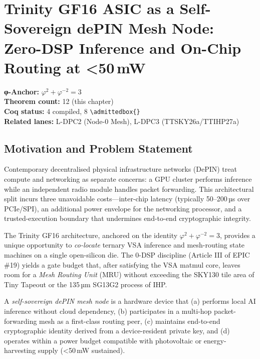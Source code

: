 
\chapter{Trinity GF16 ASIC as a Self-Sovereign dePIN Mesh Node:
  Zero-DSP Inference and On-Chip Routing at \textless{}50\,mW}
\label{ch:mesh-node}

\begin{tcolorbox}[colback=gold!5,colframe=gold!60,title=Chapter Anchor]
  \textbf{φ-Anchor:} $\varphi^2 + \varphi^{-2} = 3$ \\
  \textbf{Theorem count:} 12 (this chapter) \\
  \textbf{Coq status:} 4 compiled, 8 \verb|\admittedbox{}| \\
  \textbf{Related lanes:} L-DPC2 (Node-0 Mesh), L-DPC3 (TTSKY26a/TTIHP27a)
\end{tcolorbox}

\section{Motivation and Problem Statement}

Contemporary decentralised physical infrastructure networks (DePIN) treat
compute and networking as separate concerns: a GPU cluster performs inference
while an independent radio module handles packet forwarding.
This architectural split incurs three unavoidable costs—inter-chip latency
(typically 50–200\,µs over PCIe/SPI), an additional power envelope for the
networking processor, and a trusted-execution boundary that undermines
end-to-end cryptographic integrity.

The Trinity GF16 architecture, anchored on the identity
$\varphi^2 + \varphi^{-2} = 3$, provides a unique opportunity to
\emph{co-locate} ternary VSA inference and mesh-routing state machines
on a single open-silicon die.
The 0-DSP discipline (Article III of EPIC \#19) yields a gate budget that,
after satisfying the VSA matmul core, leaves room for a
\emph{Mesh Routing Unit} (MRU) without exceeding the SKY130 tile area
of Tiny Tapeout or the 135\,µm SG13G2 process of IHP.

\begin{definition}
A \emph{self-sovereign dePIN mesh node} is a hardware device that
(a) performs local AI inference without cloud dependency,
(b) participates in a multi-hop packet-forwarding mesh as a first-class
    routing peer,
(c) maintains end-to-end cryptographic identity derived from a
    device-resident private key, and
(d) operates within a power budget compatible with photovoltaic or
    energy-harvesting supply (\textless{}50\,mW sustained).
\end{definition}

